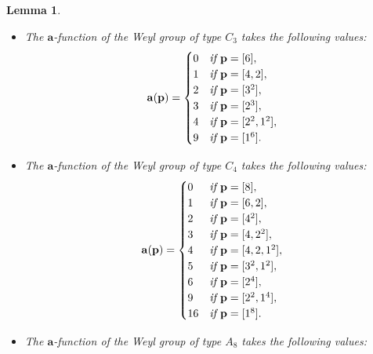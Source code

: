 \documentclass[reqno,12pt]{amsart}
\numberwithin{equation}{section}
\theoremstyle{plain}
\newtheorem{Lem}[Thm]{Lemma}
\theoremstyle{definition}
\newcommand{\aff}{ \mathbf{a} }
\begin{document}
\begin{Lem}
\begin{itemize}
  \item [(8)]  The  $\aff$-function of the Weyl group of type $C_3 $ takes the following values:
    $$\aff({\bf p})=\begin{cases}
	0 &\emph{if }{\bf p}=[6],\\
	1 &\emph{if }{\bf p}=[4,2],\\
 2 &\emph{if }{\bf p}=[3^2],\\
 3 &\emph{if }{\bf p}=[2^3],\\
 4 &\emph{if }{\bf p}=[2^2,1^2],\\
9 &\emph{if }{\bf p}=[1^6].\\
	\end{cases}
 $$
 
  \item [(9)]  The  $\aff$-function of the Weyl group of type $C_4$  takes the following values:
$$\aff({\bf p})=\begin{cases}
	0 &\emph{if }{\bf p}=[8],\\
	1 &\emph{if }{\bf p}=[6,2],\\
 2 &\emph{if }{\bf p}=[4^2],\\
 3 &\emph{if }{\bf p}=[4,2^2],\\
 4 &\emph{if }{\bf p}=[4,2,1^2],\\
 5 &\emph{if }{\bf p}=[3^2,1^2], \\
 6 &\emph{if }{\bf p}=[2^4], \\
9 &\emph{if }{\bf p}=[2^2,1^4],\\
16 &\emph{if }{\bf p}=[1^8].\\
	\end{cases}
 $$






\item [(10)]   The  $\aff$-function of the Weyl group of type $ A_8$  takes the following values:


\end{itemize}
\end{Lem}
\end{document}

